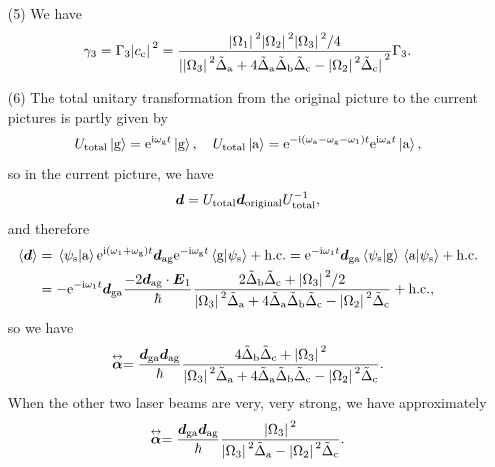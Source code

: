 \documentclass[hyperref, a4paper]{article}
\newcommand*{\ii}{\mathrm{i}}
\newcommand*{\ee}{\mathrm{e}}
\renewcommand{\tensor}[1]{ \stackrel{\leftrightarrow}{\vb*{#1}}}
\begin{document}
\begin{itemize}
\item[(5)] We have 
\begin{equation}
    \gamma_3 = \Gamma_3 \abs*{c_\text{c}}^2 = \frac{\abs*{\Omega_1}^2 \abs*{\Omega_2}^2 \abs*{\Omega_3}^2 / 4 }{ \abs*{\abs*{\Omega_3}^2 \tilde{\Delta}_\text{a} + 4 \tilde{\Delta}_\text{a} \tilde{\Delta}_\text{b} \tilde{\Delta}_\text{c} - \abs*{\Omega_2}^2 \tilde{\Delta}_\text{c}}^2 } \Gamma_3.
\end{equation} 

\item[(6)] The total unitary transformation from the original picture to the current pictures is partly given by 
\[
    U_\text{total} \ket*{\text{g}} = \ee^{\ii \omega_\text{g} t} \ket*{\text{g}}, \quad 
    U_\text{total} \ket*{\text{a}} = \ee^{- \ii (\omega_\text{a} - \omega_\text{g} - \omega_1) t} \ee^{\ii \omega_\text{a} t} \ket*{\text{a}} , 
\]
so in the current picture, we have 
\[
    \vb*{d} = U_\text{total} \vb*{d}_\text{original} U_\text{total}^{-1}, 
\]
and therefore 
\begin{equation}
    \begin{aligned}
        \expval*{\vb*{d}} &= \braket*{\psi_\text{s}}{\text{a}} \ee^{\ii (\omega_1 + \omega_\text{g}) t} \vb*{d}_\text{ag} \ee^{- \ii \omega_\text{g} t} \braket*{\text{g}}{\psi_\text{s}} + \text{h.c.} = \ee^{- \ii \omega_1 t} \vb*{d}_\text{ga} \braket*{\psi_\text{s}}{\text{g}} \braket*{\text{a}}{\psi_\text{s}} + \text{h.c.} \\
        &= - \ee^{- \ii \omega_1 t} \vb*{d}_\text{ga} \frac{-2 \vb*{d}_\text{ag} \cdot \vb*{E}_1}{\hbar} \frac{2 \tilde{\Delta}_\text{b} \tilde{\Delta}_\text{c} +  \abs*{\Omega_3}^2  / 2 }{ \abs*{\Omega_3}^2 \tilde{\Delta}_\text{a} + 4 \tilde{\Delta}_\text{a} \tilde{\Delta}_\text{b} \tilde{\Delta}_\text{c} - \abs*{\Omega_2}^2 \tilde{\Delta}_\text{c} } + \text{h.c.}  ,
    \end{aligned}
\end{equation}
so we have 
\begin{equation}
    \tensor{\vb*{\alpha}} = \frac{ \vb*{d}_\text{ga} \vb*{d}_\text{ag}}{\hbar} \frac{4 \tilde{\Delta}_\text{b} \tilde{\Delta}_\text{c} +  \abs*{\Omega_3}^2 }{ \abs*{\Omega_3}^2 \tilde{\Delta}_\text{a} + 4 \tilde{\Delta}_\text{a} \tilde{\Delta}_\text{b} \tilde{\Delta}_\text{c} - \abs*{\Omega_2}^2 \tilde{\Delta}_\text{c} } .
\end{equation}
When the other two laser beams are very, very strong, we have approximately 
\begin{equation}
    \tensor{\vb*{\alpha}} = \frac{ \vb*{d}_\text{ga} \vb*{d}_\text{ag}}{\hbar} \frac{ \abs*{\Omega_3}^2 }{ \abs*{\Omega_3}^2 \tilde{\Delta}_\text{a} - \abs*{\Omega_2}^2 \tilde{\Delta}_\text{c} } .
\end{equation}


\end{itemize}
\end{document}

